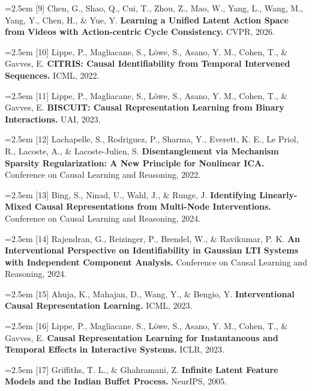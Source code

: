 \documentclass[11pt]{article}
\begin{document}
\noindent\hangindent=2.5em [9] Chen, G., Shao, Q., Cui, T., Zhou, Z., Mao, W., Yang, L., Wang, M., Yang, Y., Chen, H., \& Yue, Y. \textbf{Learning a Unified Latent Action Space from Videos with Action-centric Cycle Consistency.} CVPR, 2026.\par

\noindent\hangindent=2.5em [10] Lippe, P., Magliacane, S., L\"owe, S., Asano, Y. M., Cohen, T., \& Gavves, E. \textbf{CITRIS: Causal Identifiability from Temporal Intervened Sequences.} ICML, 2022.\par

\noindent\hangindent=2.5em [11] Lippe, P., Magliacane, S., L\"owe, S., Asano, Y. M., Cohen, T., \& Gavves, E. \textbf{BISCUIT: Causal Representation Learning from Binary Interactions.} UAI, 2023.\par

\noindent\hangindent=2.5em [12] Lachapelle, S., Rodriguez, P., Sharma, Y., Everett, K. E., Le Priol, R., Lacoste, A., \& Lacoste-Julien, S. \textbf{Disentanglement via Mechanism Sparsity Regularization: A New Principle for Nonlinear ICA.} Conference on Causal Learning and Reasoning, 2022.\par

\noindent\hangindent=2.5em [13] Bing, S., Ninad, U., Wahl, J., \& Runge, J. \textbf{Identifying Linearly-Mixed Causal Representations from Multi-Node Interventions.} Conference on Causal Learning and Reasoning, 2024.\par

\noindent\hangindent=2.5em [14] Rajendran, G., Reizinger, P., Brendel, W., \& Ravikumar, P. K. \textbf{An Interventional Perspective on Identifiability in Gaussian LTI Systems with Independent Component Analysis.} Conference on Causal Learning and Reasoning, 2024.\par

\noindent\hangindent=2.5em [15] Ahuja, K., Mahajan, D., Wang, Y., \& Bengio, Y. \textbf{Interventional Causal Representation Learning.} ICML, 2023.\par

\noindent\hangindent=2.5em [16] Lippe, P., Magliacane, S., L\"owe, S., Asano, Y. M., Cohen, T., \& Gavves, E. \textbf{Causal Representation Learning for Instantaneous and Temporal Effects in Interactive Systems.} ICLR, 2023.\par

\noindent\hangindent=2.5em [17] Griffiths, T. L., \& Ghahramani, Z. \textbf{Infinite Latent Feature Models and the Indian Buffet Process.} NeurIPS, 2005.\par
\end{document}
